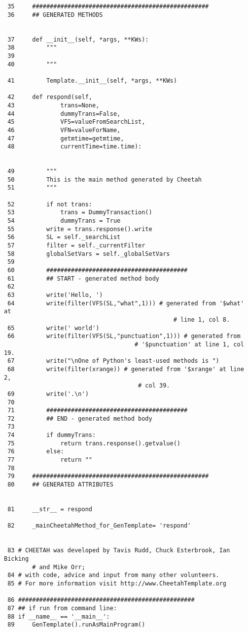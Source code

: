 \begin{verbatim}
 35	    ##################################################
 36	    ## GENERATED METHODS
    
    
 37	    def __init__(self, *args, **KWs):
 38	        """
 39	        
 40	        """
    
 41	        Template.__init__(self, *args, **KWs)
    
 42	    def respond(self,
 43	            trans=None,
 44	            dummyTrans=False,
 45	            VFS=valueFromSearchList,
 46	            VFN=valueForName,
 47	            getmtime=getmtime,
 48	            currentTime=time.time):
    
    
 49	        """
 50	        This is the main method generated by Cheetah
 51	        """
    
 52	        if not trans:
 53	            trans = DummyTransaction()
 54	            dummyTrans = True
 55	        write = trans.response().write
 56	        SL = self._searchList
 57	        filter = self._currentFilter
 58	        globalSetVars = self._globalSetVars
 59	        
 60	        ########################################
 61	        ## START - generated method body
 62	        
 63	        write('Hello, ')
 64	        write(filter(VFS(SL,"what",1))) # generated from '$what' at 
                                                # line 1, col 8.
 65	        write(' world')
 66	        write(filter(VFS(SL,"punctuation",1))) # generated from 
                                     # '$punctuation' at line 1, col 19.
 67	        write("\nOne of Python's least-used methods is ")
 68	        write(filter(xrange)) # generated from '$xrange' at line 2, 
                                      # col 39.
 69	        write('.\n')
 70	        
 71	        ########################################
 72	        ## END - generated method body
 73	        
 74	        if dummyTrans:
 75	            return trans.response().getvalue()
 76	        else:
 77	            return ""
 78	        
 79	    ##################################################
 80	    ## GENERATED ATTRIBUTES
    
    
 81	    __str__ = respond
    
 82	    _mainCheetahMethod_for_GenTemplate= 'respond'
    
    
 83	# CHEETAH was developed by Tavis Rudd, Chuck Esterbrook, Ian Bicking 
        # and Mike Orr;
 84	# with code, advice and input from many other volunteers.
 85	# For more information visit http://www.CheetahTemplate.org
    
 86	##################################################
 87	## if run from command line:
 88	if __name__ == '__main__':
 89	    GenTemplate().runAsMainProgram()
    
\end{verbatim}

